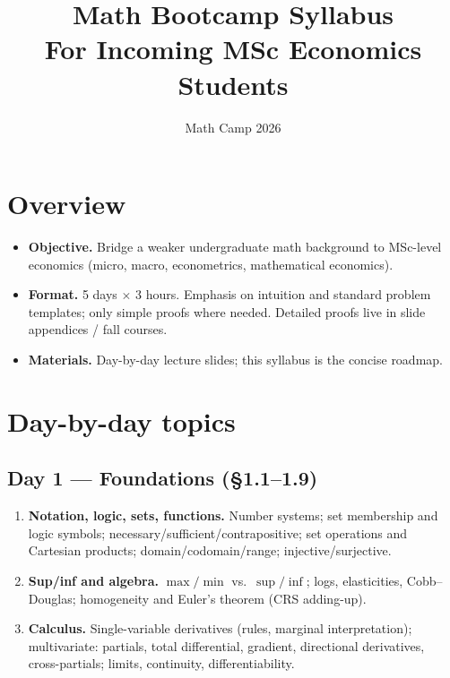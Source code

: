 \documentclass[11pt,a4paper]{article}
\title{\textbf{Math Bootcamp Syllabus}\\[0.35em]
\large For Incoming MSc Economics Students}
\author{Math Camp 2026}
\date{}
\begin{document}
\maketitle
\vspace{-1.2em}

\section*{Overview}

\begin{itemize}
  \item \textbf{Objective.} Bridge a weaker undergraduate math background to MSc-level economics (micro, macro, econometrics, mathematical economics).
  \item \textbf{Format.} 5 days $\times$ 3 hours. Emphasis on intuition and standard problem templates; only simple proofs where needed. Detailed proofs live in slide appendices / fall courses.
  \item \textbf{Materials.} Day-by-day lecture slides; this syllabus is the concise roadmap.
\end{itemize}

\section*{Day-by-day topics}

\subsection*{Day 1 --- Foundations (\S1.1--1.9)}
\begin{enumerate}
  \item \textbf{Notation, logic, sets, functions.} Number systems; set membership and logic symbols; necessary/sufficient/contrapositive; set operations and Cartesian products; domain/codomain/range; injective/surjective.
  \item \textbf{Sup/inf and algebra.} $\max/\min$ vs.\ $\sup/\inf$; logs, elasticities, Cobb--Douglas; homogeneity and Euler's theorem (CRS adding-up).
  \item \textbf{Calculus.} Single-variable derivatives (rules, marginal interpretation); multivariate: partials, total differential, gradient, directional derivatives, cross-partials; limits, continuity, differentiability.
\end{enumerate}
\end{document}
